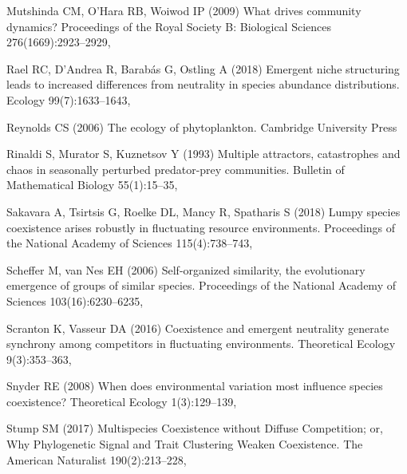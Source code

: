 \documentclass[a4paper,12pt]{article}
\begin{document}
\begin{thebibliography}{56}
Mutshinda CM, O'Hara RB, Woiwod IP (2009) What drives community dynamics?
  Proceedings of the Royal Society B: Biological Sciences 276(1669):2923--2929,

Rael RC, D'Andrea R, Barab{\'a}s G, Ostling A (2018) Emergent niche structuring
  leads to increased differences from neutrality in species abundance
  distributions. Ecology 99(7):1633--1643, 

Reynolds CS (2006) The ecology of phytoplankton. Cambridge University Press

Rinaldi S, Murator S, Kuznetsov Y (1993) Multiple attractors, catastrophes and
  chaos in seasonally perturbed predator-prey communities. Bulletin of
  Mathematical Biology 55(1):15--35, 

Sakavara A, Tsirtsis G, Roelke DL, Mancy R, Spatharis S (2018) Lumpy species
  coexistence arises robustly in fluctuating resource environments. Proceedings
  of the National Academy of Sciences 115(4):738--743,

Scheffer M, van Nes EH (2006) Self-organized similarity, the evolutionary
  emergence of groups of similar species. Proceedings of the National Academy
  of Sciences 103(16):6230--6235, 

Scranton K, Vasseur DA (2016) Coexistence and emergent neutrality generate
  synchrony among competitors in fluctuating environments. Theoretical Ecology
  9(3):353--363, 

Snyder RE (2008) When does environmental variation most influence species
  coexistence? Theoretical Ecology 1(3):129--139,

Stump SM (2017) Multispecies {Coexistence} without {Diffuse} {Competition}; or,
  {Why} {Phylogenetic} {Signal} and {Trait} {Clustering} {Weaken}
  {Coexistence}. The American Naturalist 190(2):213--228, 


\end{thebibliography}
\end{document}
